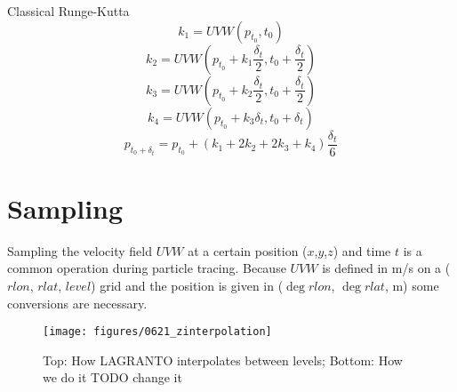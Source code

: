 Classical Runge-Kutta
\begin{equation}
	k_1 = UVW(p_{t_0}, t_0)
\end{equation}
\begin{equation}
	k_2 = UVW(p_{t_0} + k_1 \frac{\delta_t}{2}, t_0 + \frac{\delta_t}{2})
\end{equation}
\begin{equation}
	k_3 = UVW(p_{t_0} + k_2 \frac{\delta_t}{2}, t_0 + \frac{\delta_t}{2})
\end{equation}
\begin{equation}
	k_4 = UVW(p_{t_0} + k_3 \delta_t, t_0 + \delta_t)
\end{equation}
\begin{equation}
	p_{t_0 + \delta_t} = p_{t_0} + (k_1 + 2 k_2 + 2 k_3 + k_4) \frac{\delta_t}{6}
\end{equation}

\section{Sampling}
Sampling the velocity field $UVW$ at a certain position ($x$,$y$,$z$) and time $t$ is a common operation during particle tracing. Because $UVW$ is defined in m/s on a ($rlon$, $rlat$, $level$) grid and the position is given in ($\deg rlon$, $\deg rlat$, m) some conversions are necessary.
\begin{figure}
\centering \texttt{[image: figures/0621\_zinterpolation]}
\caption{Top: How LAGRANTO interpolates between levels; Bottom: How we do it TODO change it}
\label{fig:sample_z}
\end{figure}

